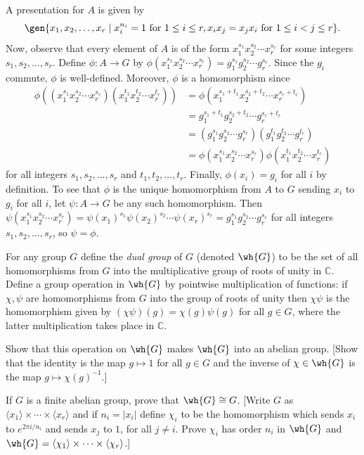 \begin{sol}
    A presentation for $A$ is given by
    \[\gen{x_1, x_2, \ldots, x_r \mid x_i^{n_i} = 1 \text{ for } 1 \leq i \leq r, x_ix_j = x_jx_i \text{ for } 1 \leq i < j \leq r}.\]
    Now, observe that every element of $A$ is of the form $x_1^{s_1} x_2^{s_2} \cdots x_r^{s_r}$ for some integers $s_1, s_2, \ldots, s_r$. Define $\phi : A \to G$ by $\phi(x_1^{s_1} x_2^{s_2} \cdots x_r^{s_r}) = g_1^{s_1} g_2^{s_2} \cdots g_r^{s_r}$. Since the $g_i$ commute, $\phi$ is well-defined. Moreover, $\phi$ is a homomorphism since
    \begin{align*}
        \phi((x_1^{s_1} x_2^{s_2} \cdots x_r^{s_r})(x_1^{t_1} x_2^{t_2} \cdots x_r^{t_r})) & = \phi(x_1^{s_1 + t_1} x_2^{s_2 + t_2} \cdots x_r^{s_r + t_r}) \\
        & = g_1^{s_1 + t_1} g_2^{s_2 + t_2} \cdots g_r^{s_r + t_r} \\
        & = (g_1^{s_1} g_2^{s_2} \cdots g_r^{s_r})(g_1^{t_1} g_2^{t_2} \cdots g_r^{t_r}) \\
        & = \phi(x_1^{s_1} x_2^{s_2} \cdots x_r^{s_r})\phi(x_1^{t_1} x_2^{t_2} \cdots x_r^{t_r})
    \end{align*}
    for all integers $s_1, s_2, \ldots, s_r$ and $t_1, t_2, \ldots, t_r$. Finally, $\phi(x_i) = g_i$ for all $i$ by definition. To see that $\phi$ is the unique homomorphism from $A$ to $G$ sending $x_i$ to $g_i$ for all $i$, let $\psi : A \to G$ be any such homomorphism. Then $\psi(x_1^{s_1} x_2^{s_2} \cdots x_r^{s_r}) = \psi(x_1)^{s_1} \psi(x_2)^{s_2} \cdots \psi(x_r)^{s_r} = g_1^{s_1} g_2^{s_2} \cdots g_r^{s_r}$ for all integers $s_1, s_2, \ldots, s_r$, so $\psi = \phi$.
\end{sol}

\begin{specialexercise}\label{ex5.2.14}
    For any group $G$ define the \emph{dual group} of $G$ (denoted $\wh{G}$) to be the set of all homomorphisms from $G$ into the multiplicative group of roots of unity in $\mathbb{C}$. Define a group operation in $\wh{G}$ by pointwise multiplication of functions: if $\chi, \psi$ are homomorphisms from $G$ into the group of roots of unity then $\chi\psi$ is the homomorphism given by $(\chi\psi)(g) = \chi(g)\psi(g)$ for all $g \in G$, where the latter multiplication takes place in $\mathbb{C}$.
    \begin{subproblems}
        \item Show that this operation on $\wh{G}$ makes $\wh{G}$ into an abelian group. [Show that the identity is the map $g \mapsto 1$ for all $g \in G$ and the inverse of $\chi \in \wh{G}$ is the map $g \mapsto \chi(g)^{-1}$.]
        \item If $G$ is a finite abelian group, prove that $\wh{G} \cong G$. [Write $G$ as $\langle x_1 \rangle \times \cdots \times \langle x_r \rangle$ and if $n_i = |x_i|$ define $\chi_i$ to be the homomorphism which sends $x_i$ to $e^{2\pi i/n_i}$ and sends $x_j$ to $1$, for all $j \neq i$. Prove $\chi_i$ has order $n_i$ in $\wh{G}$ and $\wh{G} = \langle \chi_1 \rangle \times \cdots \times \langle \chi_r \rangle$.]
    \end{subproblems}
\end{specialexercise}

